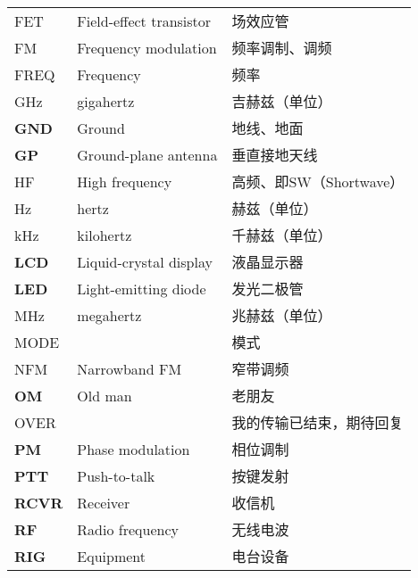 \begin{longtable}[l]{lll}
  FET            & Field-effect transistor              & 场效应管                \\
  FM             & Frequency modulation                 & 频率调制、调频             \\
  FREQ           & Frequency                            & 频率                  \\
  \si{\GHz}      & gigahertz                            & 吉赫兹（单位）             \\
  \textbf{GND}   & Ground                               & 地线、地面               \\
  \textbf{GP}    & Ground-plane antenna                 & 垂直接地天线              \\
  HF             & High frequency                       & 高频、即SW（Shortwave）   \\
  Hz             & hertz                                & 赫兹（单位）              \\
  \si{\kHz}      & kilohertz                            & 千赫兹（单位）             \\
  \textbf{LCD}   & Liquid-crystal display               & 液晶显示器               \\
  \textbf{LED}   & Light-emitting diode                 & 发光二极管               \\
  \si{\MHz}      & megahertz                            & 兆赫兹（单位）             \\
  MODE           &                                      & 模式                  \\
  NFM            & Narrowband FM                        & 窄带调频                \\
  \textbf{OM}    & Old man                              & 老朋友                 \\%
  OVER           &                                      & 我的传输已结束，期待回复        \\
  \textbf{PM}    & Phase modulation                     & 相位调制                \\
  \textbf{PTT}   & Push-to-talk                         & 按键发射                \\
  \textbf{RCVR}  & Receiver                             & 收信机                 \\
  \textbf{RF}    & Radio frequency                      & 无线电波                \\
  \textbf{RIG}   & Equipment                            & 电台设备                \\

\end{longtable}
